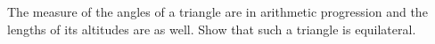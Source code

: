 The measure of the angles of a triangle are in arithmetic progression and the lengths of its altitudes are as well. Show that such a triangle is equilateral.